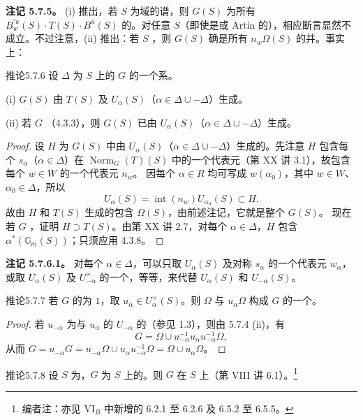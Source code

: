 \textbf{注记 5.7.5。} (i) 推出，若 $S$ 为域的谱，则 $G(S)$ 为所有 $B_w^{\prime u}(S)\cdot T(S)\cdot B^u(S)$ 的。对任意 $S$（即使是或 Artin 的），相应断言显然不成立。不过注意，(ii) 推出：若 $S$ ，则 $G(S)$ 确是所有 $n_w\Omega(S)$ 的并。事实上：
\begin{SGAresult}{推论}{5.7.6}
设 $\Delta$ 为 $S$ 上的 $G$ 的一个系。

(i) $G(S)$ 由 $T(S)$ 及 $U_\alpha(S)$（$\alpha\in\Delta\cup-\Delta$）生成。

(ii) 若 $G$ （4.3.3），则 $G(S)$ 已由 $U_\alpha(S)$（$\alpha\in\Delta\cup-\Delta$）生成。
\end{SGAresult}
\begin{proof}
设 $H$ 为 $G(S)$ 中由 $U_\alpha(S)$（$\alpha\in\Delta\cup-\Delta$）生成的。先注意 $H$ 包含每个 $s_\alpha$（$\alpha\in\Delta$）在 $\operatorname{Norm}_G(T)(S)$ 中的一个代表元（第 XX 讲 3.1），故包含每个 $w\in W$ 的一个代表元 $n_w$。
因每个 $\alpha\in R$ 均可写成 $w(\alpha_0)$，其中 $w\in W$、$\alpha_0\in\Delta$，所以
\[U_\alpha(S)=\operatorname{int}(n_w)U_{\alpha_0}(S)\subset H.\]
故由 $H$ 和 $T(S)$ 生成的包含 $\Omega(S)$，由前述注记，它就是整个 $G(S)$。
现在若 $G$ ，证明 $H\supset T(S)$。由第 XX 讲 2.7，对每个 $\alpha\in\Delta$，$H$ 包含 $\alpha^*(\mathbb G_m(S))$；只须应用 4.3.8。
\end{proof}
\textbf{注记 5.7.6.1。} 对每个 $\alpha\in\Delta$，可以只取 $U_\alpha(S)$ 及对称 $s_\alpha$ 的一个代表元 $w_\alpha$，或取 $U_\alpha(S)$ 及 $U_{-\alpha}^\times$ 的一个，等等，来代替 $U_\alpha(S)$ 和 $U_{-\alpha}(S)$。
\begin{SGAresult}{推论}{5.7.7}
若 $G$ 的为 $1$，取 $u_\alpha\in U_\alpha^\times(S)$。则 $\Omega$ 与 $u_\alpha\Omega$ 构成 $G$ 的一个。
\end{SGAresult}
\begin{proof}
若 $u_{-\alpha}$ 为与 $u_\alpha$ 的 $U_{-\alpha}$ 的（参见 1.3），则由 5.7.4 (ii)，有
\[G=\Omega\cup u_{-\alpha}^{-1}u_\alpha u_{-\alpha}^{-1}\Omega,\]
从而 $G=u_{-\alpha}G=u_{-\alpha}\Omega\cup u_\alpha u_{-\alpha}^{-1}\Omega=\Omega\cup u_\alpha\Omega$。
\end{proof}
\begin{SGAresult}{推论}{5.7.8}
设 $S$ 为，$G$ 为 $S$ 上的。则 $G$ 在 $S$ 上（第 VIII 讲 6.1）。\footnote{编者注：亦见 VI$_B$ 中新增的 6.2.1 至 6.2.6 及 6.5.2 至 6.5.5。}
\end{SGAresult}
